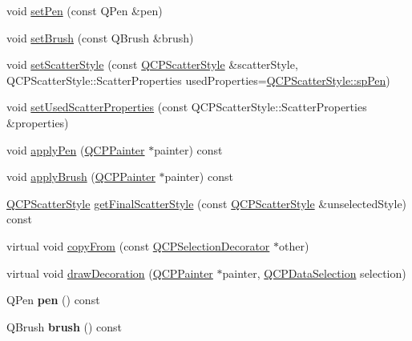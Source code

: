 \begin{DoxyCompactItemize}
\item 
void \hyperlink{class_q_c_p_selection_decorator_ac2c8192e1e294aa3a4a7f32a859e3d76}{set\+Pen} (const Q\+Pen \&pen)
\item 
void \hyperlink{class_q_c_p_selection_decorator_aa74b626be518ea17055f918d423c8c2d}{set\+Brush} (const Q\+Brush \&brush)
\item 
void \hyperlink{class_q_c_p_selection_decorator_ab403a613289714ff4fd4a0c0371ab116}{set\+Scatter\+Style} (const \hyperlink{class_q_c_p_scatter_style}{Q\+C\+P\+Scatter\+Style} \&scatter\+Style, Q\+C\+P\+Scatter\+Style\+::\+Scatter\+Properties used\+Properties=\hyperlink{class_q_c_p_scatter_style_a8974f6a20f8f6eea7781f0e6af9deb46a1b8f3179d60006d2bcfd4e14a3fcde79}{Q\+C\+P\+Scatter\+Style\+::sp\+Pen})
\item 
void \hyperlink{class_q_c_p_selection_decorator_a808c1607cd4e83869c04986e332455c0}{set\+Used\+Scatter\+Properties} (const Q\+C\+P\+Scatter\+Style\+::\+Scatter\+Properties \&properties)
\item 
void \hyperlink{class_q_c_p_selection_decorator_a9a0e62f544971034fec60e62748768b8}{apply\+Pen} (\hyperlink{class_q_c_p_painter}{Q\+C\+P\+Painter} $\ast$painter) const 
\item 
void \hyperlink{class_q_c_p_selection_decorator_aa7ecaa5c307cc65285cdf62364c69e56}{apply\+Brush} (\hyperlink{class_q_c_p_painter}{Q\+C\+P\+Painter} $\ast$painter) const 
\item 
\hyperlink{class_q_c_p_scatter_style}{Q\+C\+P\+Scatter\+Style} \hyperlink{class_q_c_p_selection_decorator_aa0c630c41103809985f41b3b81b0c308}{get\+Final\+Scatter\+Style} (const \hyperlink{class_q_c_p_scatter_style}{Q\+C\+P\+Scatter\+Style} \&unselected\+Style) const 
\item 
virtual void \hyperlink{class_q_c_p_selection_decorator_a467a8d5cfcab27e862a17c797ac27b8a}{copy\+From} (const \hyperlink{class_q_c_p_selection_decorator}{Q\+C\+P\+Selection\+Decorator} $\ast$other)
\item 
virtual void \hyperlink{class_q_c_p_selection_decorator_a4f8eb49e277063845391e803ae23054a}{draw\+Decoration} (\hyperlink{class_q_c_p_painter}{Q\+C\+P\+Painter} $\ast$painter, \hyperlink{class_q_c_p_data_selection}{Q\+C\+P\+Data\+Selection} selection)
\item 
Q\+Pen {\bfseries pen} () const \hypertarget{class_q_c_p_selection_decorator_a8365eaa0543756dd6758efa32fbe8041}{}\label{class_q_c_p_selection_decorator_a8365eaa0543756dd6758efa32fbe8041}

\item 
Q\+Brush {\bfseries brush} () const \hypertarget{class_q_c_p_selection_decorator_a661b4703ebd3115dc4b07810dd148b20}{}\label{class_q_c_p_selection_decorator_a661b4703ebd3115dc4b07810dd148b20}


\end{DoxyCompactItemize}
